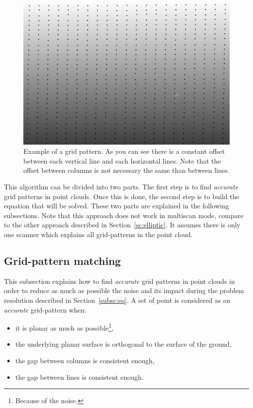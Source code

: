 \begin{figure}[H]
  \centering
  \includegraphics[scale=0.5]{img/grid1.png}
  \caption{Example of a grid pattern. As you can see there is a constant offset between each vertical line and each horizontal lines. Note that the offset between columns is not necessary the same than between lines.}
  \label{fig:grid1}
\end{figure}

This algorithm can be divided into two parts. The first step is to find \emph{accurate} grid patterns in point clouds. Once this is done, the second step is to build the equation that will be solved. These two parts are explained in the following subsections. Note that this approach does not work in multiscan mode, compare to the other approach described in Section~\ref{sc:elliptic}. It assumes there is only one scanner which explains all grid-patterns in the point cloud.

\subsection{Grid-pattern matching}
This subsection explains how to find \emph{accurate} grid patterns in point clouds in order to reduce as much as possible the noise and its impact during the problem resolution described in Section~\ref{subsc:eq}. A set of point is considered as an \emph{accurate} grid-pattern when:
\begin{itemize}
  \item it is planar as much as possible\footnote{Because of the noise.},
  \item the underlying planar surface is orthogonal to the surface of the ground,
  \item the gap between columns is consistent enough,
  \item the gap between lines is consistent enough.
\end{itemize}


